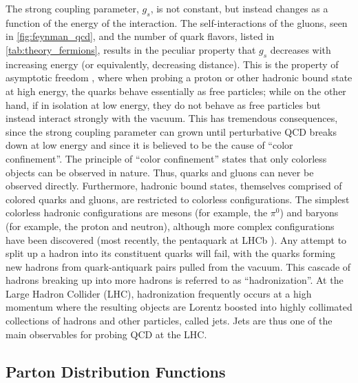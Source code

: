 The strong coupling parameter, $g_s$, is not constant, but instead
changes as a function of the energy of the interaction. The self-interactions
of the gluons, seen in \fig\ref{fig:feynman_qcd}, and the number of 
quark flavors, listed in \tab\ref{tab:theory_fermions},
results in the peculiar property that $g_s$ decreases with increasing energy 
(or equivalently, decreasing distance).
This is the property of asymptotic freedom \cite{Gross:1973id,Politzer:1973fx}, 
where when probing a proton or other hadronic bound state at high energy, 
the quarks behave essentially
as free particles; while on the other hand, 
if in isolation at low energy, they do not behave as free
particles but instead interact strongly with the 
vacuum. 
This has tremendous consequences, since the strong
coupling parameter can grown until perturbative QCD breaks down
at low energy
and since it is believed to be the cause 
of ``color confinement''.
The principle of ``color confinement'' states that
only colorless objects can be observed in nature. Thus, quarks and gluons can
never be observed directly. Furthermore, hadronic bound states,
themselves comprised of colored quarks and gluons, are restricted
to colorless configurations. The simplest colorless hadronic configurations
are mesons (for example, the $\pi^0$) and baryons (for example, the proton 
and neutron),
although more complex configurations have been discovered (most
recently, the pentaquark at LHCb \cite{Aaij:2015tga}).
Any attempt to split up a hadron into its constituent quarks 
will fail, with the quarks forming new hadrons from quark-antiquark
pairs pulled from the vacuum. This cascade of hadrons 
breaking up into more hadrons is referred to as ``hadronization''.
At the Large Hadron Collider (LHC), hadronization frequently occurs
at a high momentum where the resulting objects are Lorentz boosted 
into highly collimated collections of hadrons and other particles, called jets. 
Jets are thus one of the main observables for probing QCD at the LHC.

\subsection{Parton Distribution Functions}
\label{sec:pdf}

